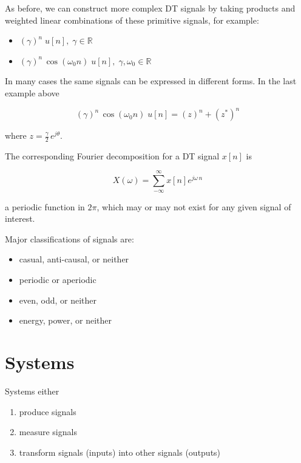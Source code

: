 \documentclass{article}
\begin{document}
As before, we can construct more complex DT signals by taking products and weighted linear combinations of these primitive signals, for example:

\begin{itemize}

\item $\left(\gamma\right)^n\; u[n],\; \gamma\in\mathbb{R}$
\item $\left(\gamma\right)^n\,\cos(\omega_0 n)\; u[n],\; \gamma,\omega_0\in\mathbb{R}$
\end{itemize}

In many cases the same signals can be expressed in different forms. In the last example above

\begin{equation}
  \left(\gamma\right)^n\,\cos(\omega_0 n)\; u[n] = \left(z\right)^n + \left(z^*\right)^n
\end{equation}

where $z = \frac{\gamma}{2}\, e^{j\theta}$.

The corresponding Fourier decomposition for a DT signal $x[n]$ is

\begin{equation}
  X(\omega) = \sum\limits_{-\infty}^{\infty} x[n] e^{j\omega\, n}
\end{equation}

a periodic function in $2\pi$, which may or may not exist for any given signal of interest.

Major classifications of signals are:
\begin{itemize}
\item casual, anti-causal, or neither
\item periodic or aperiodic
\item even, odd, or neither
\item energy, power, or neither
\end{itemize}

\section{Systems}

Systems either

\begin{enumerate}
\item produce signals
\item measure signals
\item transform signals (inputs) into other signals (outputs)
\end{enumerate}
\end{document}

